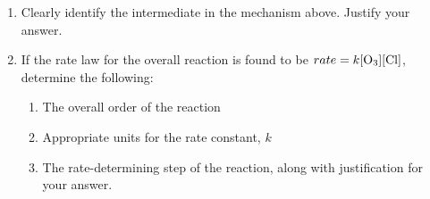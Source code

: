 \documentclass[12pt]{article}
\begin{document}
\begin{enumerate}
\begin{enumerate}
      \item Clearly identify the intermediate in the mechanism above. Justify your answer.

      \item If the rate law for the overall reaction is found to be $rate=k[\ce{O3}][\ce{Cl}]$, determine the following: 

        \begin{enumerate}

          \item The overall order of the reaction

          \item Appropriate units for the rate constant, $k$

          \item The rate-determining step of the reaction, along with justification for your answer.

        \end{enumerate}

    \end{enumerate}

\end{enumerate}
\end{document}
